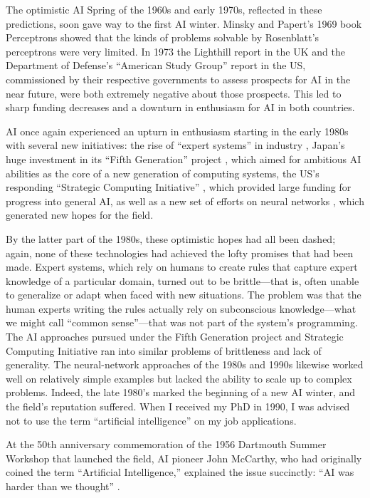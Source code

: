 \documentclass[12pt]{article}
\begin{document}
The optimistic AI Spring of the 1960s and early 1970s, reflected in these predictions, soon gave way to the first AI winter.  Minsky and Papert's 1969 book Perceptrons \cite{Minsky1969} showed that the kinds of problems solvable by Rosenblatt's perceptrons were very limited. In 1973 the Lighthill report \cite{Lighthill1973} in the UK and the Department of Defense's ``American Study Group'' report in the US, commissioned by their respective governments to assess prospects for AI in the near future, were both extremely negative about those prospects. This led to sharp funding decreases and a downturn in enthusiasm for AI in both countries.

AI once again experienced an upturn in enthusiasm starting in the early 1980s with several new initiatives: the rise of ``expert systems'' in industry \cite{Durkin1996},  Japan's huge investment in its ``Fifth Generation'' project \cite{Gaines1984}, which aimed for ambitious AI abilities as the core of a new generation of computing systems, the US's responding ``Strategic Computing Initiative'' \cite{Stefik1985}, which provided large funding for progress into general AI, as well as a new set of efforts on neural networks \cite{McClelland1986a,McClelland1986b}, which generated new hopes for the field.

By the latter part of the 1980s, these optimistic hopes had all been dashed; again, none of these technologies had achieved the lofty promises that had been made.  Expert systems, which rely on humans to create rules that capture expert knowledge of a particular domain, turned out to be brittle---that is, often unable to generalize or adapt when faced with new situations.  The problem was that the human experts writing the rules actually rely on subconscious knowledge---what we might call ``common sense''---that was not part of the system's programming.  The AI approaches pursued under the Fifth Generation project and Strategic Computing Initiative ran into similar problems of brittleness and lack of generality.  The neural-network approaches of the 1980s and 1990s likewise worked well on relatively simple examples but lacked the ability to scale up to complex problems. Indeed, the late 1980's marked the beginning of a new AI winter, and the field's reputation suffered.  When I received my PhD in 1990, I was advised not to use the term ``artificial intelligence'' on my job applications.

At the 50th anniversary commemoration of the 1956 Dartmouth Summer Workshop that launched the field, AI pioneer John McCarthy, who had originally coined the term ``Artificial Intelligence,'' explained the issue succinctly: ``AI was harder than we thought'' \cite{Moewes2013}.
\end{document}
